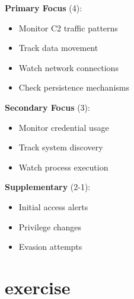 \begin{description}
   \item \textbf{Primary Focus} (4):
   \begin{itemize}
       \item Monitor C2 traffic patterns
       \item Track data movement
       \item Watch network connections
       \item Check persistence mechanisms
   \end{itemize}
   
   \item \textbf{Secondary Focus} (3):
   \begin{itemize}
       \item Monitor credential usage
       \item Track system discovery
       \item Watch process execution
   \end{itemize}
   
   \item \textbf{Supplementary} (2-1):
   \begin{itemize}
       \item Initial access alerts
       \item Privilege changes
       \item Evasion attempts
   \end{itemize}
\end{description}

\section{exercise}

